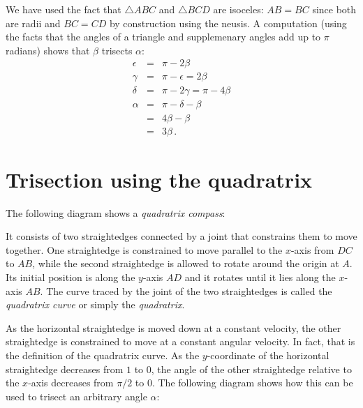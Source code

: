We have used the fact that $\triangle ABC$ and $\triangle BCD$ are isoceles: $AB=BC$ since both are radii and $BC=CD$ by construction using the neusis. A computation (using the facts that the angles of a triangle and supplemenary angles add up to $\pi$ radians) shows that $\beta$ trisects $\alpha$:
\begin{eqnarray*}
\epsilon &=& \pi - 2\beta\\
\gamma &=& \pi - \epsilon = 2\beta\\
\delta &=& \pi - 2\gamma = \pi - 4\beta\\
\alpha &=& \pi - \delta - \beta\\
&=& 4\beta -\beta\\
&=& 3\beta\,.
\end{eqnarray*}


\section{Trisection using the quadratrix}\label{s.q}

The following diagram shows a \emph{quadratrix compass}:
\begin{center}
\end{center}
It consists of two straightedges connected by a joint that constrains them to move together. One straightedge is constrained to move parallel to the $x$-axis from $DC$ to $AB$, while the second straightedge is allowed to rotate around the origin at $A$. Its initial position is along the $y$-axis $AD$ and it rotates until it lies along the $x$-axis $AB$. The curve traced by the joint of the two straightedges is called the \emph{quadratrix curve} or simply the \emph{quadratrix}.

As the horizontal straightedge is moved down at a constant velocity, the other straightedge is constrained to move at a constant angular velocity. In fact, that is the definition of the quadratrix curve. As the $y$-coordinate of the horizontal straightedge decreases from $1$ to $0$, the angle of the other straightedge relative to the $x$-axis decreases from $\pi/2$ to $0$. The following diagram shows how this can be used to trisect an arbitrary angle $\alpha$:

